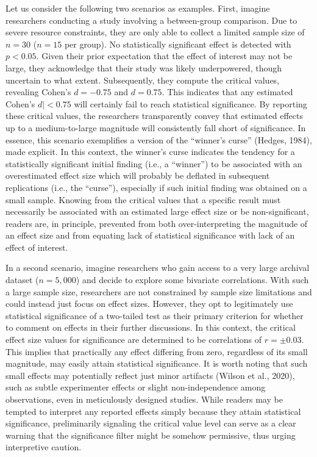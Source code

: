 \documentclass[
  man]{apa7}
\begin{document}
Let us consider the following two scenarios as examples. First, imagine researchers conducting a study involving a between-group comparison. Due to severe resource constraints, they are only able to collect a limited sample size of \(n = 30\) (\(n = 15\) per group). No statistically significant effect is detected with \(p < 0.05\). Given their prior expectation that the effect of interest may not be large, they acknowledge that their study was likely underpowered, though uncertain to what extent. Subsequently, they compute the critical values, revealing Cohen's \(d = -0.75\) and \(d = 0.75\). This indicates that any estimated \textbar Cohen's \(d| < 0.75\) will certainly fail to reach statistical significance. By reporting these critical values, the researchers transparently convey that estimated effects up to a medium-to-large magnitude will consistently fall short of significance. In essence, this scenario exemplifies a version of the ``winner's curse'' (Hedges, 1984), made explicit. In this context, the winner's curse indicates the tendency for a statistically significant initial finding (i.e., a ``winner'') to be associated with an overestimated effect size which will probably be deflated in subsequent replications (i.e., the ``curse''), especially if such initial finding was obtained on a small sample. Knowing from the critical values that a specific result must necessarily be associated with an estimated large effect size or be non-significant, readers are, in principle, prevented from both over-interpreting the magnitude of an effect size and from equating lack of statistical significance with lack of an effect of interest.

In a second scenario, imagine researchers who gain access to a very large archival dataset (\(n = 5,000\)) and decide to explore some bivariate correlations. With such a large sample size, researchers are not constrained by sample size limitations and could instead just focus on effect sizes. However, they opt to legitimately use statistical significance of a two-tailed test as their primary criterion for whether to comment on effects in their further discussions. In this context, the critical effect size values for significance are determined to be correlations of \(r = \pm 0.03\). This implies that practically any effect differing from zero, regardless of its small magnitude, may easily attain statistical significance. It is worth noting that such small effects may potentially reflect just minor artifacts (Wilson et al., 2020), such as subtle experimenter effects or slight non-independence among observations, even in meticulously designed studies. While readers may be tempted to interpret any reported effects simply because they attain statistical significance, preliminarily signaling the critical value level can serve as a clear warning that the significance filter might be somehow permissive, thus urging interpretive caution.
\end{document}
